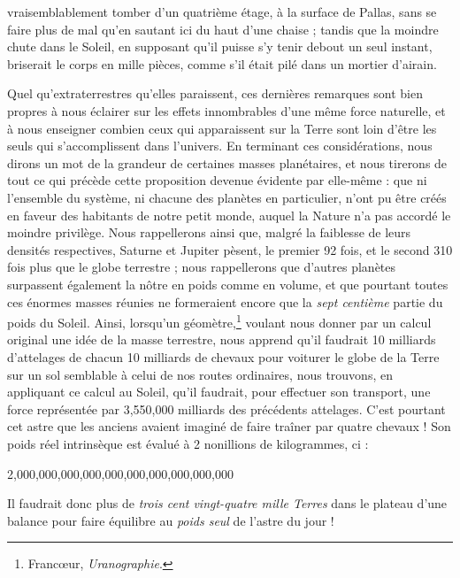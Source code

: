 \documentclass[a4paper, 11pt, oneside]{article}
\begin{document}
vraisemblablement tomber d'un quatrième étage, à la surface de Pallas, sans se faire plus de mal qu'en sautant ici du haut d'une chaise ; tandis que la moindre chute dans le Soleil, en supposant qu'il puisse s'y tenir debout un seul instant, briserait le corps en mille pièces, comme s'il était pilé dans un mortier d'airain.

Quel qu'extraterrestres qu'elles paraissent, ces dernières remarques sont bien propres à nous éclairer sur les effets innombrables d'une même force naturelle, et à nous enseigner combien ceux qui apparaissent sur la Terre sont loin d'être les seuls qui s'accomplissent dans l'univers. En terminant ces considérations, nous dirons un mot de la grandeur de certaines masses planétaires, et nous tirerons de tout ce qui précède cette proposition devenue évidente par elle-même : que ni l'ensemble du système, ni chacune des planètes en particulier, n'ont pu être créés en faveur des habitants de notre petit monde, auquel la Nature n'a pas accordé le moindre privilège. Nous rappellerons ainsi que, malgré la faiblesse de leurs densités respectives, Saturne et Jupiter pèsent, le premier 92 fois, et le second 310 fois plus que le globe terrestre ; nous rappellerons que d'autres planètes surpassent également la nôtre en poids comme en volume, et que pourtant toutes ces énormes masses réunies ne formeraient encore que la \emph{sept centième} partie du poids du Soleil. Ainsi, lorsqu'un géomètre,\footnote{Francœur, \emph{Uranographie}.} voulant nous donner par un calcul original une idée de la masse terrestre, nous apprend qu'il faudrait 10 milliards d'attelages de chacun 10 milliards de chevaux pour voiturer le globe de la Terre sur un sol semblable à celui de nos routes ordinaires, nous trouvons, en appliquant ce calcul au Soleil, qu'il faudrait, pour effectuer son transport, une force représentée par 3,550,000 milliards des précédents attelages. C'est pourtant cet astre que les anciens avaient imaginé de faire traîner par quatre chevaux ! Son poids réel intrinsèque est évalué à 2 nonillions de kilogrammes, ci :

2,000,000,000,000,000,000,000,000,000,000

Il faudrait donc plus de \emph{trois cent vingt-quatre mille Terres} dans le plateau d'une balance pour faire équilibre au \emph{poids seul} de l'astre du jour !
\end{document}
